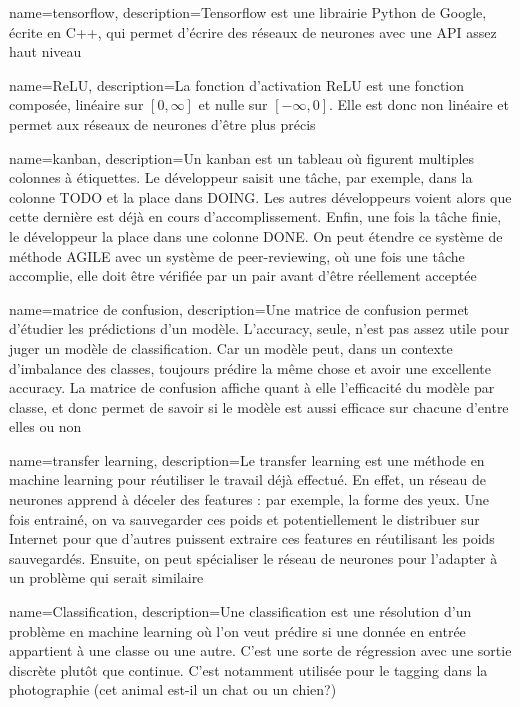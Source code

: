 {
    name=tensorflow,
    description={Tensorflow est une librairie Python de Google, écrite en C++, qui permet d'écrire des réseaux de neurones avec une API assez haut niveau}
}

{
    name=ReLU,
    description={La fonction d'activation ReLU est une fonction composée, linéaire sur $[0, \infty]$ et nulle sur $[-\infty, 0]$. Elle est donc non linéaire et permet aux réseaux de neurones d'être plus précis}
}

{
    name=kanban,
    description={Un kanban est un tableau où figurent multiples colonnes à étiquettes. Le développeur saisit une tâche, par exemple, dans la colonne TODO et la place dans DOING. Les autres développeurs voient alors que cette dernière est déjà en cours d'accomplissement. Enfin, une fois la tâche finie, le développeur la place dans une colonne DONE. On peut étendre ce système de méthode AGILE avec un système de peer-reviewing, où une fois une tâche accomplie, elle doit être vérifiée par un pair avant d'être réellement acceptée}
}

{
    name=matrice de confusion,
    description={Une matrice de confusion permet d'étudier les prédictions d'un modèle. L'accuracy, seule, n'est pas assez utile pour juger un modèle de classification. Car un modèle peut, dans un contexte d'imbalance des classes, toujours prédire la même chose et avoir une excellente accuracy. La matrice de confusion affiche quant à elle l'efficacité du modèle par classe, et donc permet de savoir si le modèle est aussi efficace sur chacune d'entre elles ou non}
}

{
    name=transfer learning,
    description={Le transfer learning est une méthode en machine learning pour réutiliser le travail déjà effectué. En effet, un réseau de neurones apprend à déceler des features : par exemple, la forme des yeux. Une fois entrainé, on va sauvegarder ces poids et potentiellement le distribuer sur Internet pour que d'autres puissent extraire ces features en réutilisant les poids sauvegardés. Ensuite, on peut spécialiser le réseau de neurones pour l'adapter à un problème qui serait similaire}
}

{
    name=Classification,
    description={Une classification est une résolution d'un problème en machine learning où l'on veut prédire si une donnée en entrée appartient à une classe ou une autre. C'est une sorte de régression avec une sortie discrète plutôt que continue. C'est notamment utilisée pour le tagging dans la photographie (cet animal est-il un chat ou un chien?)}
}


